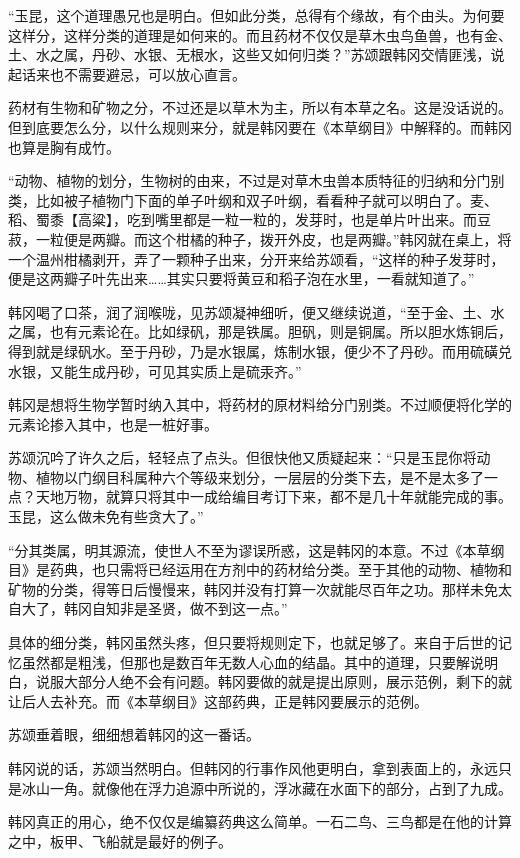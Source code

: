 “玉昆，这个道理愚兄也是明白。但如此分类，总得有个缘故，有个由头。为何要这样分，这样分类的道理是如何来的。而且药材不仅仅是草木虫鸟鱼兽，也有金、土、水之属，丹砂、水银、无根水，这些又如何归类？”苏颂跟韩冈交情匪浅，说起话来也不需要避忌，可以放心直言。

药材有生物和矿物之分，不过还是以草木为主，所以有本草之名。这是没话说的。但到底要怎么分，以什么规则来分，就是韩冈要在《本草纲目》中解释的。而韩冈也算是胸有成竹。

“动物、植物的划分，生物树的由来，不过是对草木虫兽本质特征的归纳和分门别类，比如被子植物门下面的单子叶纲和双子叶纲，看看种子就可以明白了。麦、稻、蜀黍【高粱】，吃到嘴里都是一粒一粒的，发芽时，也是单片叶出来。而豆菽，一粒便是两瓣。而这个柑橘的种子，拨开外皮，也是两瓣。”韩冈就在桌上，将一个温州柑橘剥开，弄了一颗种子出来，分开来给苏颂看，“这样的种子发芽时，便是这两瓣子叶先出来……其实只要将黄豆和稻子泡在水里，一看就知道了。”

韩冈喝了口茶，润了润喉咙，见苏颂凝神细听，便又继续说道，“至于金、土、水之属，也有元素论在。比如绿矾，那是铁属。胆矾，则是铜属。所以胆水炼铜后，得到就是绿矾水。至于丹砂，乃是水银属，炼制水银，便少不了丹砂。而用硫磺兑水银，又能生成丹砂，可见其实质上是硫汞齐。”

韩冈是想将生物学暂时纳入其中，将药材的原材料给分门别类。不过顺便将化学的元素论掺入其中，也是一桩好事。

苏颂沉吟了许久之后，轻轻点了点头。但很快他又质疑起来：“只是玉昆你将动物、植物以门纲目科属种六个等级来划分，一层层的分类下去，是不是太多了一点？天地万物，就算只将其中一成给编目考订下来，都不是几十年就能完成的事。玉昆，这么做未免有些贪大了。”

“分其类属，明其源流，使世人不至为谬误所惑，这是韩冈的本意。不过《本草纲目》是药典，也只需将已经运用在方剂中的药材给分类。至于其他的动物、植物和矿物的分类，得等日后慢慢来，韩冈并没有打算一次就能尽百年之功。那样未免太自大了，韩冈自知非是圣贤，做不到这一点。”

具体的细分类，韩冈虽然头疼，但只要将规则定下，也就足够了。来自于后世的记忆虽然都是粗浅，但那也是数百年无数人心血的结晶。其中的道理，只要解说明白，说服大部分人绝不会有问题。韩冈要做的就是提出原则，展示范例，剩下的就让后人去补充。而《本草纲目》这部药典，正是韩冈要展示的范例。

苏颂垂着眼，细细想着韩冈的这一番话。

韩冈说的话，苏颂当然明白。但韩冈的行事作风他更明白，拿到表面上的，永远只是冰山一角。就像他在浮力追源中所说的，浮冰藏在水面下的部分，占到了九成。

韩冈真正的用心，绝不仅仅是编纂药典这么简单。一石二鸟、三鸟都是在他的计算之中，板甲、飞船就是最好的例子。

